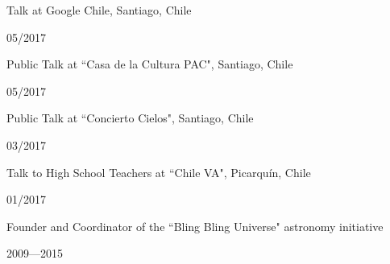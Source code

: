 \documentclass[12pt, a4paper]{article} %
\begin{document}
\begin{minipage}[t]{0.7\textwidth}
\begin{flushleft}%
  \setlength{\leftskip}{0.2cm}%
Talk at Google Chile, Santiago, Chile
\end{flushleft}
\end{minipage}
\begin{minipage}[t]{0.3\textwidth}
\hfill 05/2017
\end{minipage}

\begin{minipage}[t]{0.7\textwidth}
\begin{flushleft}%
  \setlength{\leftskip}{0.2cm}%
Public Talk at ``Casa de la Cultura PAC", Santiago, Chile
\end{flushleft}
\end{minipage}
\begin{minipage}[t]{0.3\textwidth}
\hfill 05/2017
\end{minipage}

\begin{minipage}[t]{0.7\textwidth}
\begin{flushleft}%
  \setlength{\leftskip}{0.2cm}%
Public Talk at ``Concierto Cielos", Santiago, Chile
\end{flushleft}
\end{minipage}
\begin{minipage}[t]{0.3\textwidth}
\hfill 03/2017
\end{minipage}

\begin{minipage}[t]{0.7\textwidth}
\begin{flushleft}%
  \setlength{\leftskip}{0.2cm}%
Talk to High School Teachers at ``Chile VA", Picarqu\'in, Chile
\end{flushleft}
\end{minipage}
\begin{minipage}[t]{0.3\textwidth}
\hfill 01/2017
\end{minipage}


\begin{minipage}[t]{0.8\textwidth}
\begin{flushleft}%
  \setlength{\leftskip}{0.2cm}%
Founder and Coordinator of the ``Bling Bling Universe" astronomy initiative
\end{flushleft}
\end{minipage}
\begin{minipage}[t]{0.2\textwidth}
\hfill 2009---2015
\end{minipage}
\end{document}
